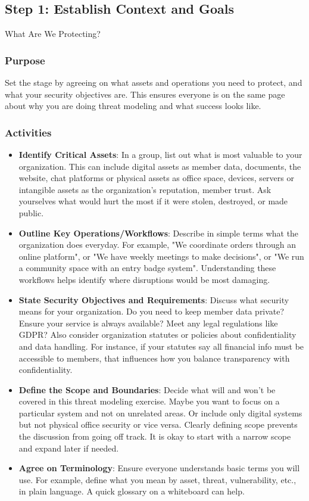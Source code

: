 \subsection{Step 1: Establish Context and Goals}
\label{subsec:Step1}

What Are We Protecting?

\subsubsection{Purpose}

Set the stage by agreeing on what assets and operations you need to protect, and
what your security objectives are. This ensures everyone is on the same page
about why you are doing threat modeling and what success looks like. 

\subsubsection{Activities}

\begin{itemize}
    \item \textbf{Identify Critical Assets}: In a group, list out what is most
valuable to your organization. This can include digital assets as member data,
documents, the website, chat platforms or physical assets as office space, devices,
servers or intangible assets as the organization's reputation, member trust.
Ask yourselves what would hurt the most if it were stolen, destroyed, or made
public.
    \item \textbf{Outline Key Operations/Workflows}: Describe in simple terms
what the organization does everyday. For example, "We coordinate orders through an
online platform", or "We have weekly meetings to make decisions", or "We run a
community space with an entry badge system". Understanding these workflows helps
identify where disruptions would be most damaging.
    \item \textbf{State Security Objectives and Requirements}: Discuss what
security means for your organization. Do you need to keep member data private? Ensure
your service is always available? Meet any legal regulations like GDPR? Also consider
organization statutes or policies about confidentiality and data handling.
For instance, if your statutes say all financial info must be accessible
to members, that influences how you balance transparency with confidentiality.
    \item \textbf{Define the Scope and Boundaries}: Decide what will and won't
be covered in this threat modeling exercise. Maybe you want to focus on a
particular system and not on unrelated areas. Or include only digital systems but not
physical office security or vice versa. Clearly defining scope prevents the discussion from
going off track. It is okay to start with a narrow scope and expand later if needed.
    \item \textbf{Agree on Terminology}: Ensure everyone understands basic terms
you will use. For example, define what you mean by asset, threat, vulnerability,
etc., in plain language. A quick glossary on a whiteboard can help.
\end{itemize}

